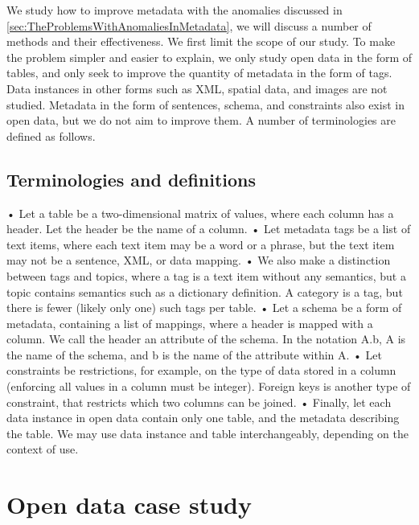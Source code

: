 We study how to improve metadata with the anomalies discussed in \autoref{sec:TheProblemsWithAnomaliesInMetadata}, we will discuss a number of methods and their effectiveness. We first limit the scope of our study. To make the problem simpler and easier to explain, we only study open data in the form of tables, and only seek to improve the quantity of metadata in the form of tags. Data instances in other forms such as XML, spatial data, and images are not studied. Metadata in the form of sentences, schema, and constraints also exist in open data, but we do not aim to improve them. A number of terminologies are defined as follows.

\subsection{Terminologies and definitions}
• Let a table be a two-dimensional matrix of values, where each column has a header. Let the header be the name of a column.
• Let metadata tags be a list of text items, where each text item may be a word or a phrase, but the text item may not be a sentence, XML, or data mapping.
• We also make a distinction between tags and topics, where a tag is a text item without any semantics, but a topic contains semantics such as a dictionary definition. A category is a tag, but there is fewer (likely only one) such tags per table.
• Let a schema be a form of metadata, containing a list of mappings, where a header is mapped with a column. We call the header an attribute of the schema. In the notation A.b, A is the name of the schema, and b is the name of the attribute within A.
• Let constraints be restrictions, for example, on the type of data stored in a column (enforcing all values in a column must be integer). Foreign keys is another type of constraint, that restricts which two columns can be joined.
• Finally, let each data instance in open data contain only one table, and the metadata describing the table. We may use data instance and table interchangeably, depending on the context of use.

\section{Open data case study}
\label{sec:OpenDataCaseStudy}

